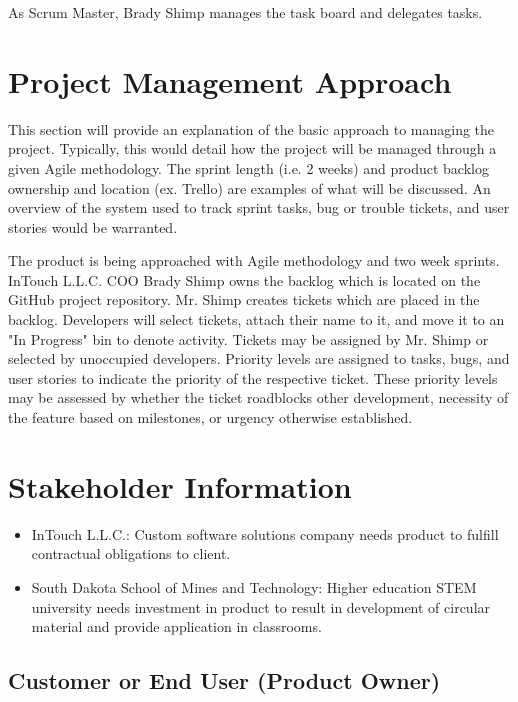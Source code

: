 As Scrum Master, Brady Shimp manages the task board and delegates tasks. 

\section{Project  Management Approach}
This section will provide an explanation of the basic approach to managing the 
project.  Typically, this would detail how the project will be managed through 
a given Agile methodology.  The sprint length (i.e. 2 weeks) and product backlog 
ownership and location (ex. Trello) are examples of what will be discussed.  An 
overview of the system used to track sprint tasks, bug or trouble tickets, and 
user stories would be warranted. 

The product is being approached with Agile methodology and two week sprints. InTouch L.L.C. COO Brady Shimp owns the backlog which is located on the GitHub project repository. Mr. Shimp creates tickets which are placed in the backlog. Developers will select tickets, attach their name to it, and move it to an "In Progress" bin to denote activity. Tickets may be assigned by Mr. Shimp or selected by unoccupied developers. Priority levels are assigned to tasks, bugs, and user stories to indicate the priority of the respective ticket. These priority levels may be assessed by whether the ticket roadblocks other development, necessity of the feature based on milestones, or urgency otherwise established.

\section{ Stakeholder Information}



\begin{itemize}
	\item InTouch L.L.C.: Custom software solutions company needs product to fulfill contractual obligations to client. 
	\item South Dakota School of Mines and Technology: Higher education STEM university needs investment in product to result in development of circular material and provide application in classrooms.
\end{itemize}


\subsection{Customer or End User (Product Owner)}

